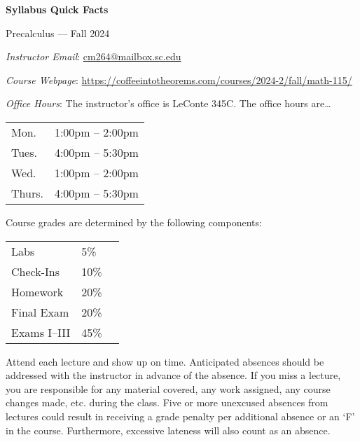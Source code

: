 \documentclass[11pt,letterpaper]{article}
\begin{document}
\begin{center} 
\bfseries
\color{scred}
\LARGE Syllabus Quick Facts \par\vspace{0.2\baselineskip}
\Large Precalculus --- Fall 2024
\end{center} \pspace


\hspace{0.53cm} {\itshape Instructor Email}: \href{mailto:cm264@mailbox.sc.edu}{cm264@mailbox.sc.edu} \par
\hspace{0.53cm} {\itshape Course Webpage}: \href{https://coffeeintotheorems.com/courses/2024-2/fall/math-115/}{https://coffeeintotheorems.com/courses/2024-2/fall/math-115/} \par
\hspace{0.53cm} {\itshape Office Hours}: The instructor's office is LeConte 345C. The office hours are\dots \par \vspace{-0.3cm}
	\begin{table}[!ht]
	\centering
	\begin{tabular}{l || l}
	Mon. & 1:00pm -- 2:00pm \\
	Tues. & 4:00pm -- 5:30pm \\
	Wed. & 1:00pm -- 2:00pm \\
	Thurs. & 4:00pm -- 5:30pm
	\end{tabular}
	\end{table}


Course grades are determined by the following components: \par \vspace{-0.3cm}
	\begin{table}[!ht]
        \begin{tabular}{llr}
        Labs & 5\% \\
	Check-Ins & 10\% \\
	Homework & 20\% \\
	Final Exam & 20\% \\
	Exams I--III & 45\% \\
        \end{tabular} 
        \end{table}


Attend each lecture and show up on time. Anticipated absences should be addressed with the instructor in advance of the absence. If you miss a lecture, you are responsible for any material covered, any work assigned, any course changes made, etc. during the class. Five or more unexcused absences from lectures could result in receiving a grade penalty per additional absence or an `F' in the course. Furthermore, excessive lateness will also count as an absence. \pspace
\end{document}
